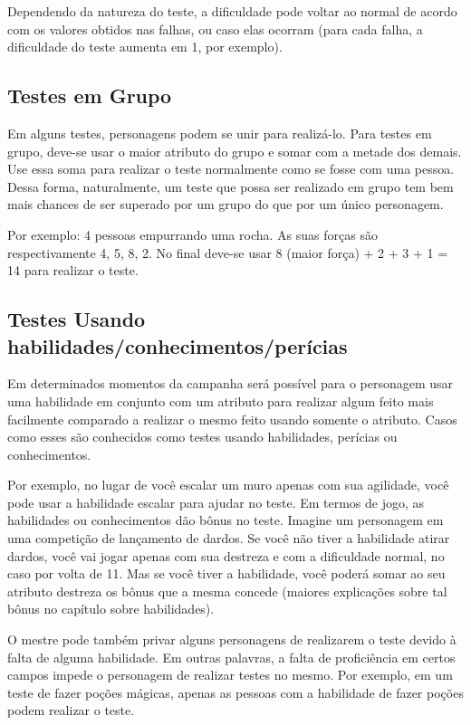 Dependendo da natureza do teste, a dificuldade pode voltar ao normal de acordo com os valores obtidos nas falhas, ou caso elas ocorram (para cada falha, a dificuldade do teste aumenta em 1, por exemplo).
\subsection{Testes em Grupo}

Em alguns testes, personagens podem se unir para realizá-lo. Para testes em grupo, deve-se usar o maior atributo do grupo e somar com a metade dos demais. Use essa soma para realizar o teste normalmente como se fosse com uma pessoa. Dessa forma, naturalmente, um teste que possa ser realizado em grupo tem bem mais chances de ser superado por um grupo do que por um único personagem.

Por exemplo: 4 pessoas empurrando uma rocha. As suas forças são respectivamente 4, 5, 8, 2. No final deve-se usar 8 (maior força) + 2 + 3 + 1 = 14 para realizar o teste.

\subsection{Testes Usando habilidades/conhecimentos/perícias}

Em determinados momentos da campanha será possível para o personagem usar uma habilidade em conjunto com um atributo para realizar algum feito mais facilmente comparado a realizar o mesmo feito usando somente o atributo. Casos como esses são conhecidos como testes usando habilidades, perícias ou conhecimentos.

Por exemplo, no lugar de você escalar um muro apenas com sua agilidade, você pode usar a habilidade escalar para ajudar no teste. Em termos de jogo, as habilidades ou conhecimentos dão bônus no teste. Imagine um personagem em uma competição de lançamento de dardos. Se você não tiver a habilidade atirar dardos, você vai jogar apenas com sua destreza e com a dificuldade normal, no caso por volta de 11. Mas se você tiver a habilidade, você poderá somar ao seu atributo destreza os bônus que a mesma concede (maiores explicações sobre tal bônus no capítulo sobre habilidades).

O mestre pode também privar alguns personagens de realizarem o teste devido à falta de alguma habilidade. Em outras palavras, a falta de proficiência em certos campos impede o personagem de realizar testes no mesmo. Por exemplo, em um teste de fazer poções mágicas, apenas as pessoas com a habilidade de fazer poções podem realizar o teste.

